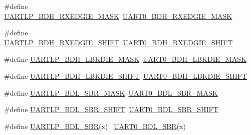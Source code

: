 \begin{DoxyCompactItemize}
\item 
\#define \hyperlink{group___backward___compatibility___symbols_gad02c1fb9539a43c1fea5e16d23505cbd}{U\+A\+R\+T\+L\+P\+\_\+\+B\+D\+H\+\_\+\+R\+X\+E\+D\+G\+I\+E\+\_\+\+M\+A\+SK}~\hyperlink{group___u_a_r_t0___register___masks_ga345980eca350a190e8fc3e39109a0eea}{U\+A\+R\+T0\+\_\+\+B\+D\+H\+\_\+\+R\+X\+E\+D\+G\+I\+E\+\_\+\+M\+A\+SK}
\item 
\#define \hyperlink{group___backward___compatibility___symbols_ga9128322e4fc496b2e73502b8fe09062e}{U\+A\+R\+T\+L\+P\+\_\+\+B\+D\+H\+\_\+\+R\+X\+E\+D\+G\+I\+E\+\_\+\+S\+H\+I\+FT}~\hyperlink{group___u_a_r_t0___register___masks_gad8f5143553887979638377da46673dfc}{U\+A\+R\+T0\+\_\+\+B\+D\+H\+\_\+\+R\+X\+E\+D\+G\+I\+E\+\_\+\+S\+H\+I\+FT}
\item 
\#define \hyperlink{group___backward___compatibility___symbols_ga8e7625a181ceadbf341a36dfcb59db33}{U\+A\+R\+T\+L\+P\+\_\+\+B\+D\+H\+\_\+\+L\+B\+K\+D\+I\+E\+\_\+\+M\+A\+SK}~\hyperlink{group___u_a_r_t0___register___masks_ga84132309b565d272671dde5d912a1611}{U\+A\+R\+T0\+\_\+\+B\+D\+H\+\_\+\+L\+B\+K\+D\+I\+E\+\_\+\+M\+A\+SK}
\item 
\#define \hyperlink{group___backward___compatibility___symbols_gaeda76f3a18048d7d090663cff717da2c}{U\+A\+R\+T\+L\+P\+\_\+\+B\+D\+H\+\_\+\+L\+B\+K\+D\+I\+E\+\_\+\+S\+H\+I\+FT}~\hyperlink{group___u_a_r_t0___register___masks_gae43cfa2facfc6b00c2a7b75ed410f407}{U\+A\+R\+T0\+\_\+\+B\+D\+H\+\_\+\+L\+B\+K\+D\+I\+E\+\_\+\+S\+H\+I\+FT}
\item 
\#define \hyperlink{group___backward___compatibility___symbols_ga3a8fa23722acd6ab86121c94976e93f7}{U\+A\+R\+T\+L\+P\+\_\+\+B\+D\+L\+\_\+\+S\+B\+R\+\_\+\+M\+A\+SK}~\hyperlink{group___u_a_r_t0___register___masks_ga63fd23d0429a94909f330f711cccd226}{U\+A\+R\+T0\+\_\+\+B\+D\+L\+\_\+\+S\+B\+R\+\_\+\+M\+A\+SK}
\item 
\#define \hyperlink{group___backward___compatibility___symbols_ga8d8755af50afa7907f2c6124816ce6c0}{U\+A\+R\+T\+L\+P\+\_\+\+B\+D\+L\+\_\+\+S\+B\+R\+\_\+\+S\+H\+I\+FT}~\hyperlink{group___u_a_r_t0___register___masks_gab076db54da38acfc6ba27dfa8431a8b2}{U\+A\+R\+T0\+\_\+\+B\+D\+L\+\_\+\+S\+B\+R\+\_\+\+S\+H\+I\+FT}
\item 
\#define \hyperlink{group___backward___compatibility___symbols_ga97e34f8e26f2bb993e31e1b53e738b51}{U\+A\+R\+T\+L\+P\+\_\+\+B\+D\+L\+\_\+\+S\+BR}(x)                                            ~\hyperlink{group___u_a_r_t0___register___masks_ga6eda626a36ea4a87cf4a09aec541cebf}{U\+A\+R\+T0\+\_\+\+B\+D\+L\+\_\+\+S\+BR}(x)
\item 

\end{DoxyCompactItemize}
